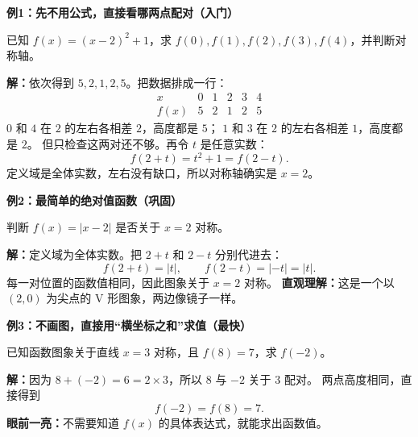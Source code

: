 \clearpage
\begin{examplebox}
  \textbf{\textcolor{CExample}{例1：先不用公式，直接看哪两点配对（入门）}}


  已知 $f(x)=(x-2)^2+1$，求 $f(0),f(1),f(2),f(3),f(4)$，并判断对称轴。

  \textbf{解：}依次得到 $5,2,1,2,5$。把数据排成一行：
  \[
    \begin{array}{c|ccccc}
      x&0&1&2&3&4\\ \hline
      f(x)&5&2&1&2&5
    \end{array}
  \]
  $0$ 和 $4$ 在 $2$ 的左右各相差 $2$，高度都是 $5$；
  $1$ 和 $3$ 在 $2$ 的左右各相差 $1$，高度都是 $2$。
  但只检查这两对还不够。再令 $t$ 是任意实数：
  \[
    f(2+t)=t^2+1=f(2-t).
  \]
  定义域是全体实数，左右没有缺口，所以对称轴确实是 $x=2$。

  \medskip
  
\end{examplebox}
\clearpage
\begin{examplebox}
\textbf{\textcolor{CExample}{例2：最简单的绝对值函数（巩固）}}


  判断 $f(x)=|x-2|$ 是否关于 $x=2$ 对称。

  \textbf{解：}定义域为全体实数。把 $2+t$ 和 $2-t$ 分别代进去：
  \[
    f(2+t)=|t|,\qquad f(2-t)=|-t|=|t|.
  \]
  每一对位置的函数值相同，因此图象关于 $x=2$ 对称。
  \textbf{直观理解：}这是一个以 $(2,0)$ 为尖点的 V 形图象，两边像镜子一样。

  \medskip
  
\end{examplebox}
\clearpage
\begin{examplebox}
\textbf{\textcolor{CExample}{例3：不画图，直接用“横坐标之和”求值（最快）}}


  已知函数图象关于直线 $x=3$ 对称，且 $f(8)=7$，求 $f(-2)$。

  \textbf{解：}因为 $8+(-2)=6=2\times3$，所以 $8$ 与 $-2$ 关于 $3$ 配对。
  两点高度相同，直接得到
  \[
    \boxed{f(-2)=f(8)=7}.
  \]
  \textbf{眼前一亮：}不需要知道 $f(x)$ 的具体表达式，就能求出函数值。

  \medskip
  
\end{examplebox}
\clearpage
